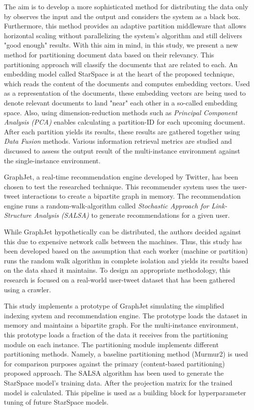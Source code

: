The aim is to develop a more sophisticated method for distributing the data only by observes the input and the output and considers the system as a black box. Furthermore, this method provides an adaptive partition middleware that allows horizontal scaling without parallelizing the system's algorithm and still delivers "good enough" results. With this aim in mind, in this study, we present a new method for partitioning document data based on their relevancy. This partitioning approach will classify the documents that are related to each. An embedding model called StarSpace is at the heart of the proposed technique, which reads the content of the documents and computes embedding vectors. Used as a representation of the documents, these embedding vectors are being used to denote relevant documents to land "near" each other in a so-called embedding space. Also, using dimension-reduction methods such as \emph{Principal Component Analysis (PCA)} enables calculating a partition-ID for each upcoming document. After each partition yields its results, these results are gathered together using \emph{Data Fusion} methods. Various information retrieval metrics are studied and discussed to assess the output result of the multi-instance environment against the single-instance environment.



GraphJet, a real-time recommendation engine developed by Twitter, has been chosen to test the researched technique. This recommender system uses the user-tweet interactions to create a bipartite graph in memory. The recommendation engine runs a random-walk-algorithm called \emph{Stochastic Approach for Link-Structure Analysis (SALSA)} to generate recommendations for a given user. 


While GraphJet hypothetically can be distributed, the authors decided against this due to expensive network calls between the machines. Thus, this study has been developed based on the assumption that each worker (machine or partition) runs the random walk algorithm in complete isolation and yields its results based on the data shard it maintains. To design an appropriate methodology, this research is focused on a real-world user-tweet dataset that has been gathered using a crawler. 


This study implements a prototype of GraphJet simulating the simplified indexing system and recommendation engine. The prototype loads the dataset in memory and maintains a bipartite graph. For the multi-instance environment, this prototype loads a fraction of the data it receives from the partitioning module on each instance. The partitioning module implements different partitioning methods. Namely, a baseline partitioning method (Murmur2) is used for comparison purposes against the primary (content-based partitioning) proposed approach. The SALSA algorithm has been used to generate the StarSpace model's training data. After the projection matrix for the trained model is calculated. This pipeline is used as a building block for hyperparameter tuning of future StarSpace models.



